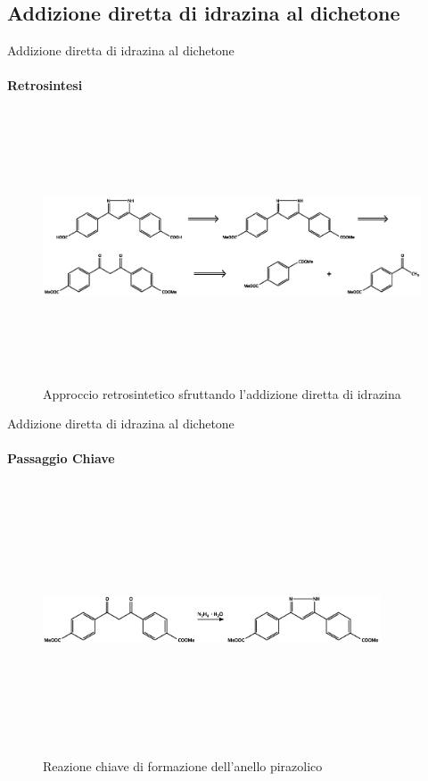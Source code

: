 \documentclass{beamer}
\begin{document}
\subsection{Addizione diretta di idrazina al dichetone}
\begin{frame}{Addizione diretta di idrazina al dichetone}
	\framesubtitle{Retrosintesi}
	\begin{figure}[h]
		\centering
		\includegraphics[width=14cm,height=8cm,keepaspectratio]{../Structures/pyr-retro.eps}
		\caption{Approccio retrosintetico sfruttando l'addizione diretta di idrazina}
	\end{figure}
\end{frame}

\begin{frame}{Addizione diretta di idrazina al dichetone}
	\framesubtitle{Passaggio Chiave}
	\begin{figure}[h]
		\centering
		\includegraphics[width=10cm,height=8cm,keepaspectratio]{../Structures/pyrazole-form.eps}
		\caption{Reazione chiave di formazione dell'anello pirazolico}
	\end{figure}
\end{frame}
\end{document}
